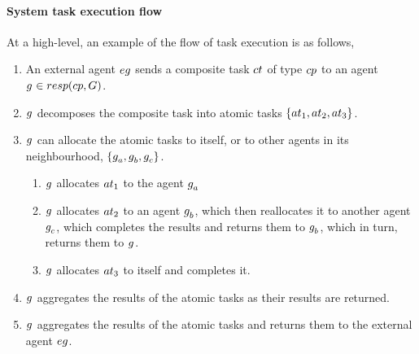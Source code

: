 \paragraph{System task execution flow}

At a high-level, an example of the flow of task execution is as follows,

\begin{enumerate}
	\item An external agent $\varExternalAgent{}{}$ sends a composite task $\varCompositeTask{}{}$ of type $\varCompositeTaskType{}{}$ to an agent $\varAgent{}{} \in \functionTaskResponsibilities{}{}$. 
	\item $g_{}^{}$ decomposes the composite task into atomic tasks $\lbrace \varAtomicTask{1}{}, \varAtomicTask{2}{}, \varAtomicTask{3}{} \rbrace$.
	
	\item $g_{}^{}$ can allocate the atomic tasks to itself, or to other agents in its neighbourhood, $\lbrace g_{a}^{}, g_{b}^{}, g_{c}^{} \rbrace$.
	\begin{enumerate}
		\item $g_{}^{}$ allocates $\varAtomicTask{1}{}$ to the agent $g_{a}^{}$
		\item $g_{}^{}$ allocates $\varAtomicTask{2}{}$ to an agent $g_{b}^{}$, which then reallocates it to another agent $g_{c}^{}$, which completes the results and returns them to $g_{b}^{}$, which in turn, returns them to $g_{}^{}$.
		\item $g_{}^{}$ allocates $\varAtomicTask{3}{}$ to itself and completes it.
	\end{enumerate}
	\item $g_{}^{}$ aggregates the results of the atomic tasks as their results are returned.
	\item $g_{}^{}$ aggregates the results of the atomic tasks and returns them to the external agent $\varExternalAgent{}{}$.
\end{enumerate}

